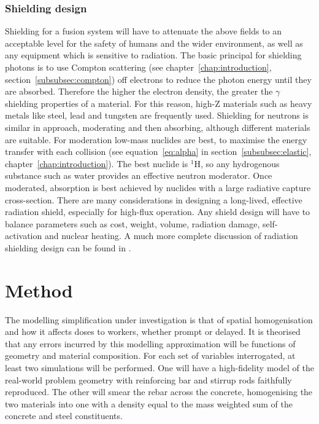 \subsubsection{Shielding design}
Shielding for a fusion system will have to attenuate the above fields to an acceptable level for the safety of humans and the wider environment, as well as any equipment which is sensitive to radiation. The basic principal for shielding photons is to use Compton scattering (see chapter~\ref{chap:introduction}, section~\ref{subsubsec:compton}) off electrons to reduce the photon energy until they are absorbed. Therefore the higher the electron density, the greater the $\gamma$ shielding properties of a material. For this reason, high-Z materials such as heavy metals like steel, lead and tungsten are frequently used. Shielding for neutrons is similar in approach, moderating and then absorbing, although different materials are suitable. For moderation low-mass nuclides are best, to maximise the energy transfer with each collision (see equation~\ref{eq:alpha} in section~\ref{subsubsec:elastic}, chapter~\ref{chap:introduction}). The best nuclide is $^{1}$H, so any hydrogenous substance such as water provides an effective neutron moderator. Once moderated, absorption is best achieved by nuclides with a large radiative capture cross-section. There are many considerations in designing a long-lived, effective radiation shield, especially for high-flux operation. Any shield design will have to balance parameters such as cost, weight, volume, radiation damage, self-activation and nuclear heating. A much more complete discussion of radiation shielding design can be found in \cite{Price1959}.

\section{Method}
The modelling simplification under investigation is that of spatial homogenisation and how it affects doses to workers, whether prompt or delayed. It is theorised that any errors incurred by this modelling approximation will be functions of geometry and material composition. For each set of variables interrogated, at least two simulations will be performed. One will have a high-fidelity model of the real-world problem geometry with reinforcing bar and stirrup rods faithfully reproduced. The other will smear the rebar across the concrete, homogenising the two materials into one with a density equal to the mass weighted sum of the concrete and steel constituents. 

